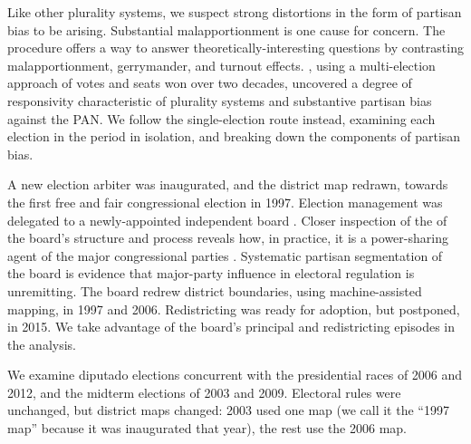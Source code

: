 \documentclass[letter,12pt]{article}
\begin{document}
Like other plurality systems, we suspect strong distortions in the form of partisan bias to be arising. Substantial malapportionment is one cause for concern. The procedure offers a way to answer theoretically-interesting questions by contrasting malapportionment, gerrymander, and turnout effects. \citet{marquez2014biasBlog}, using a multi-election approach of votes and seats won over two decades, uncovered a degree of responsivity characteristic of plurality systems and substantive partisan bias against the PAN. We follow the single-election route instead, examining each election in the period in isolation, and breaking down the components of partisan bias. 

A new election arbiter was inaugurated, and the district map redrawn, towards the first free and fair congressional election in 1997. Election management was delegated to a newly-appointed independent board \citep[the Federal Electoral Institute IFE, see][]{lujambio.vives.2008}. Closer inspection of the of the board's structure and process reveals how, in practice, it is a power-sharing agent of the major congressional parties \citep{estevez.magar.rosas.2008}. Systematic partisan segmentation of the board is evidence that major-party influence in electoral regulation is unremitting. The board redrew district boundaries, using machine-assisted mapping, in 1997 and 2006. Redistricting was ready for adoption, but postponed, in 2015. We take advantage of the board's principal and redistricting episodes in the analysis. 

We examine diputado elections concurrent with the presidential races of 2006 and 2012, and the midterm elections of 2003 and 2009. Electoral rules were unchanged, but district maps changed: 2003 used one map (we call it the ``1997 map'' because it was inaugurated that year), the rest use the 2006 map. 
\end{document}
